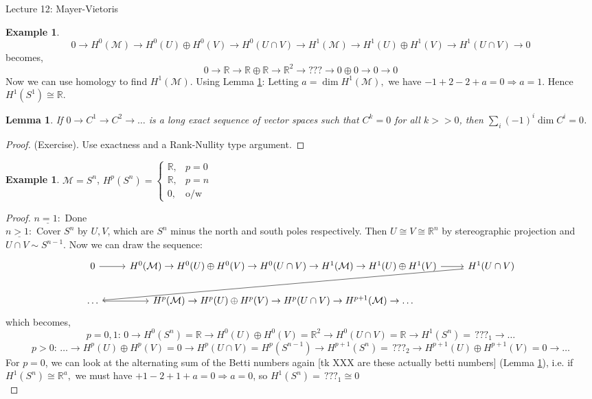 \documentclass[10pt]{article}
\theoremstyle{plain}
\newtheorem{lemma}[thm]{Lemma}
\theoremstyle{definition}
\newtheorem{exmp}[thm]{Example} %
\newcommand{\Real}{\mathbb{R}}
\newcommand{\man}{\mathcal{M}}
\newcommand{\sumfromto}[2]{\sum\limits_{#1}^{#2}}
\newcommand{\cohomman}[1]{H^{#1}(\man)}
\newcommand{\UintV}{U\cap V}
\newcommand{\cohomUV}[1]{H^{#1}(U)\oplus H^{#1}(V)}
\newcommand{\cohom}[2]{H^{#1}(#2)}
\begin{document}
\begin{section}{Lecture 12: Mayer-Vietoris}
\begin{exmp}
$$0 \to \cohomman{0} \to H^0(U)\oplus H^0(V) \to H^0(\UintV) \to \cohomman{1} \to H^1(U)\oplus H^1(V) \to H^1(\UintV) \to 0
$$
becomes,
$$0 \to \Real \to \Real \oplus \Real \to \Real^2 \to ??? \to 0 \oplus 0 \to 0 \to 0$$
Now we can use homology to find $\cohomman{1}$. Using Lemma \ref{lemma:longexactsequencedimensionsum}: Letting $a =\dim \cohomman{1}, $ we have $-1 + 2 -2 + a = 0 \Rightarrow a = 1.$ Hence $H^1(S^1) \cong \Real$.
\end{exmp}
\begin{lemma}\label{lemma:longexactsequencedimensionsum}
If $0 \to C^1 \to C^2 \to \dots$ is a long exact sequence of vector spaces such that $C^k = 0 $ for all $k >>0$, then $\sumfromto{i}{} (-1)^i \dim C^i = 0 $.
\end{lemma}
\begin{proof}
(Exercise). Use exactness and a Rank-Nullity type argument.
\end{proof}
\begin{exmp} $\man = S^n$, $H^p(S^n) = \begin{cases} \Real ,& p = 0\\ \Real, & p = n\\ 0, & \text{o/w}\end{cases}$\\
\begin{proof}
$\underline{n=1:}$ Done\\
$\underline{ n > 1:}$ Cover $S^n$ by $U, V$, which are $S^n$ minus the north and south poles respectively. Then $U\cong V \cong \Real^n$ by stereographic projection and $\UintV \sim S^{n-1}$. Now we can draw the sequence:
$$
\begin{tikzcd}
0 \arrow[r]&  \cohomman{0} \to H^0(U)\oplus H^0(V) \to H^0(\UintV) \to \cohomman{1} \to H^1(U)\oplus H^1(V) \arrow[r] &  H^1(\UintV) \arrow[lld]                                                                 \\
\dots \arrow[r]                                                                                                               &   H^p(\man) \to  H^p(U)\oplus H^p(V) \to H^p(\UintV) \to H^{p+1}(\man) \to \dots
\end{tikzcd}
$$
which becomes,
$$p = 0,1: \, 0 \to \cohom{0}{S^n}  = \Real\to \cohomUV{0} = \Real^2 \to \cohom{0}{\UintV} = \Real \to \cohom{1}{S^n} = \,???_1 \to \dots$$
$$p > 0 : \, \dots \to \cohomUV{p} = 0 \to \cohom{p}{\UintV} = \cohom{p}{S^{n-1}} \to \cohom{p+1}{S^n} =\, ???_2 \to \cohomUV{p+1} = 0\to \dots$$
For $p = 0$, we can look at the alternating sum of the Betti numbers again [tk XXX are these actually betti numbers] (Lemma \ref{lemma:longexactsequencedimensionsum}), i.e. if $\cohom{1}{S^n} \cong \Real ^a,$ we must have $+1 -2 +1 +a = 0 \Rightarrow a = 0$, so $\cohom{1}{S^n} = \,???_1 \cong 0$\\

\end{proof}
\end{exmp}
\end{section}
\end{document}
